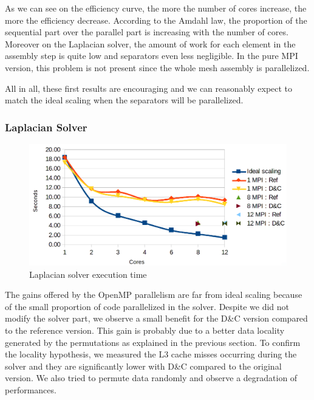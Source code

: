 \documentclass{IOS-Book-Article}
\begin{document}
As we can see on the efficiency curve, the more the number of cores increase, the more the efficiency decrease. According to the Amdahl law,
the proportion of the sequential part over the parallel part is increasing with the number of cores. Moreover on the Laplacian solver, the amount of work for each
element in the assembly step is quite low and separators even less negligible. In the pure MPI version, this problem is not present since the whole mesh assembly is parallelized.

All in all, these first results are encouraging and we can reasonably expect to match the ideal scaling when the separators will be parallelized.

\subsubsection{Laplacian Solver}
\begin{figure}[htp]
 \centering
 \label{fig7}
 \includegraphics[scale=0.2]{Laplacian_solver_time.png}
 \caption{Laplacian solver execution time}
\end{figure}
The gains offered by the OpenMP parallelism are far from ideal scaling because of the small proportion of code parallelized in the solver.
Despite we did not modify the solver part, we observe a small benefit for the D\&C version compared to the reference version.
This gain is probably due to a better data locality generated by the permutations as explained in the previous section.
To confirm the locality hypothesis, we measured the L3 cache misses occurring during the solver and they are significantly lower with D\&C compared to the original version.
We also tried to permute data randomly and observe a degradation of performances.
\end{document}
